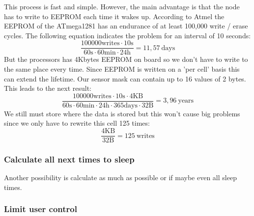 This process is fast and simple. However, the main advantage is that the node has to write to EEPROM each time it wakes up. According to Atmel the EEPROM of the ATmega1281 has an endurance of at least 100,000 write / erase cycles. The following equation indicates the problem for an interval of 10 seconds:
\begin{equation}
\frac{100000 \mathrm{writes} \cdot 10 \mathrm{s}}{60 \mathrm{s} \cdot 60 \mathrm{min} \cdot 24 \mathrm{h}}= 11,57 \: \mathrm{days} 
\label{eq:1}
\end{equation}
But the processors has 4Kbytes EEPROM on board so we don't have to write to the same place every time. Since EEPROM is written on a 'per cell' basis this can extend the lifetime. Our sensor mask can contain up to 16 values of 2 bytes. This leads to the next result:
\begin{equation}
\frac{100000 \mathrm{writes} \cdot 10 \mathrm{s} \cdot 4\mathrm{KB}}{60 \mathrm{s} \cdot 60 \mathrm{min} \cdot 24 \mathrm{h} \cdot 365\mathrm{days} \cdot 32\mathrm{B}} = 3,96\: \mathrm{years}
\end{equation}
We still must store where the data is stored but this won't cause big problems since we only have to rewrite this cell 125 times:
\begin{equation}
\frac{4\mathrm{KB}}{32\mathrm{B}} = 125 \: \mathrm{writes}
\end{equation}

\subsubsection{Calculate all next times to sleep}
Another possibility is calculate as much as possible or if maybe even all sleep times. 
\subsubsection{Limit user control}


